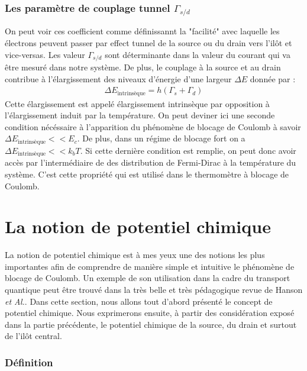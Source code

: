 \subsubsection{Les paramètre de couplage tunnel $\Gamma_{s/d}$}
On peut voir ces coefficient comme définissannt la "facilité" avec laquelle les électrons peuvent passer par effect tunnel de la source ou du drain vers l'il\^ot et vice-versas. Les valeur $\Gamma_{s/d}$ sont déterminante dans la valeur du courant qui va \^etre mesuré dans notre système. De plus, le couplage à la source et au drain contribue à l'élargissement des niveaux d'énergie d'une largeur $\Delta E$ donnée par :
\begin{eqnarray}
\Delta E_{\text{intrinsèque}} = h (\Gamma_s + \Gamma_d)
\end{eqnarray}
Cette élargissement est appelé élargissement intrinsèque par opposition à l'élargissement induit par la température. On peut deviner ici une seconde condition nécéssaire à l'apparition du phénomène de blocage de Coulomb à savoir $\Delta E_{\text{intrinsèque}} << E_c$. De plus, dans un régime de blocage fort on a $\Delta E_{\text{intrinsèque}} << k_bT$. Si cette dernière condition est remplie, on peut donc avoir accès par l'intermédiaire de des distribution de Fermi-Dirac à la température du système. C'est cette propriété qui est utilisé dans le thermomètre à blocage de Coulomb.





\section{La notion de potentiel chimique}
La notion de potentiel chimique est à mes yeux une des notions les plus importantes afin de comprendre de manière simple et intuitive le phénomène de blocage de Coulomb. Un exemple de son utilisation dans la cadre du transport quantique peut \^etre trouvé dans la très belle et très pédagogique revue de Hanson \textit{et Al.}. Dans cette section, nous allons tout d'abord présenté le concept de potentiel chimique. Nous exprimerons ensuite, à partir des considération exposé dans la partie précédente, le potentiel chimique de la source, du drain et surtout de l'ilôt central.

\subsubsection{Définition}

